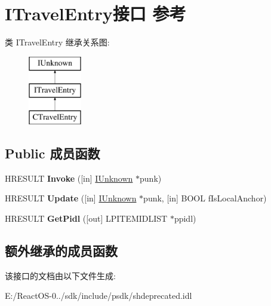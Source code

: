 \hypertarget{interface_i_travel_entry}{}\section{I\+Travel\+Entry接口 参考}
\label{interface_i_travel_entry}
类 I\+Travel\+Entry 继承关系图\+:\begin{figure}[H]
\begin{center}
\leavevmode
\includegraphics[height=3.000000cm]{interface_i_travel_entry}
\end{center}
\end{figure}
\subsection*{Public 成员函数}
\begin{DoxyCompactItemize}
\item 
\mbox{\label{interface_i_travel_entry_a03cf7ed4e0589bf27d4f806a71dbe314}} 
H\+R\+E\+S\+U\+LT {\bfseries Invoke} (\mbox{[}in\mbox{]} \hyperlink{interface_i_unknown}{I\+Unknown} $\ast$punk)
\item 
\mbox{\label{interface_i_travel_entry_a8b569ddd66dd5d626e8521c15f96ffc6}} 
H\+R\+E\+S\+U\+LT {\bfseries Update} (\mbox{[}in\mbox{]} \hyperlink{interface_i_unknown}{I\+Unknown} $\ast$punk, \mbox{[}in\mbox{]} B\+O\+OL f\+Is\+Local\+Anchor)
\item 
\mbox{\label{interface_i_travel_entry_aa1ca90bd69f5bc89e128ffb1b739b51f}} 
H\+R\+E\+S\+U\+LT {\bfseries Get\+Pidl} (\mbox{[}out\mbox{]} L\+P\+I\+T\+E\+M\+I\+D\+L\+I\+ST $\ast$ppidl)
\end{DoxyCompactItemize}
\subsection*{额外继承的成员函数}


该接口的文档由以下文件生成\+:\begin{DoxyCompactItemize}
\item 
E\+:/\+React\+O\+S-\/0../sdk/include/psdk/shdeprecated.\+idl\end{DoxyCompactItemize}
